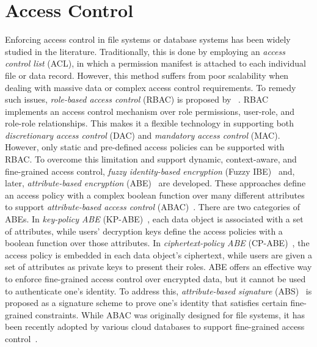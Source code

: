 \section{Access Control}

Enforcing access control in file systems or database systems has been widely studied in the literature. Traditionally, this is done by employing an \emph{access control list} (ACL), in which a permission manifest is attached to each individual file or data record. However, this method suffers from poor scalability when dealing with massive data or complex access control requirements. To remedy such issues, \emph{role-based access control} (RBAC) is proposed by \citeauthor{10.1109/2.485845}~\cite{10.1109/2.485845}. RBAC implements an access control mechanism over role permissions, user-role, and role-role relationships. This makes it a flexible technology in supporting both \emph{discretionary access control} (DAC) and \emph{mandatory access control} (MAC). However, only static and pre-defined access policies can be supported with RBAC\@. To overcome this limitation and support dynamic, context-aware, and fine-grained access control, \emph{fuzzy identity-based encryption} (Fuzzy IBE)~\cite{10.1007/11426639_27} and, later, \emph{attribute-based encryption} (ABE)~\cite{10.1145/1180405.1180418} are developed. These approaches define an access policy with a complex boolean function over many different attributes to support \emph{attribute-based access control} (ABAC)~\cite{10.1109/ccgrid.2012.92}. There are two categories of ABEs. In \emph{key-policy ABE} (KP-ABE)~\cite{10.1145/1180405.1180418}, each data object is associated with a set of attributes, while users' decryption keys define the access policies with a boolean function over those attributes. In \emph{ciphertext-policy ABE} (CP-ABE)~\cite{10.1109/sp.2007.11}, the access policy is embedded in each data object's ciphertext, while users are given a set of attributes as private keys to present their roles. ABE offers an effective way to enforce fine-grained access control over encrypted data, but it cannot be used to authenticate one's identity. To address this, \emph{attribute-based signature} (ABS)~\cite{10.1007/978-3-642-19074-2_24,10.1145/1755688.1755697} is proposed as a signature scheme to prove one's identity that satisfies certain fine-grained constraints. While ABAC was originally designed for file systems, it has been recently adopted by various cloud databases to support fine-grained access control~\cite{10.1145/2699026.2699101,10.1007/978-3-662-43936-4_21,10.1007/s10916-016-0588-0}.

